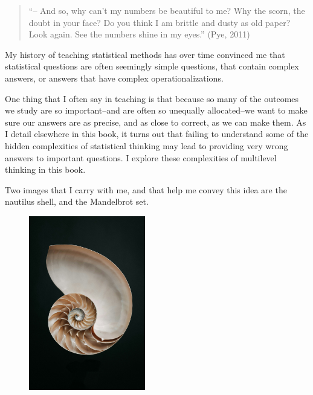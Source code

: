 \documentclass[
  letterpaper,
  DIV=11,
  numbers=noendperiod]{scrreprt}
\begin{document}
\begin{quote}
``-- And so, why can't my numbers be beautiful to me? Why the scorn, the
doubt in your face? Do you think I am brittle and dusty as old paper?
Look again. See the numbers shine in my eyes.'' (Pye, 2011)
\end{quote}

\begin{tcolorbox}[enhanced jigsaw, opacityback=0, coltitle=black, rightrule=.15mm, toprule=.15mm, bottomtitle=1mm, bottomrule=.15mm, breakable, colframe=quarto-callout-tip-color-frame, titlerule=0mm, opacitybacktitle=0.6, leftrule=.75mm, left=2mm, colback=white, toptitle=1mm, colbacktitle=quarto-callout-tip-color!10!white, title=\textcolor{quarto-callout-tip-color}{\faLightbulb}\hspace{0.5em}{Complex Answers Hidden Inside Simple Questions}, arc=.35mm]

My history of teaching statistical methods has over time convinced me
that statistical questions are often seemingly simple questions, that
contain complex answers, or answers that have complex
operationalizations.

One thing that I often say in teaching is that because so many of the
outcomes we study are so important--and are often so unequally
allocated--we want to make sure our answers are as precise, and as close
to correct, as we can make them. As I detail elsewhere in this book, it
turns out that failing to understand some of the hidden complexities of
statistical thinking may lead to providing very wrong answers to
important questions. I explore these complexities of multilevel thinking
in this book.

\newpage{}

Two images that I carry with me, and that help me convey this idea are
the nautilus shell, and the Mandelbrot set. 
 

\begin{figure}[H]

\begin{minipage}{0.50\linewidth}

\includegraphics[width=\textwidth,height=3in]{nautilus-OUP.jpg}


\end{minipage}
\end{figure}
\end{tcolorbox}
\end{document}
